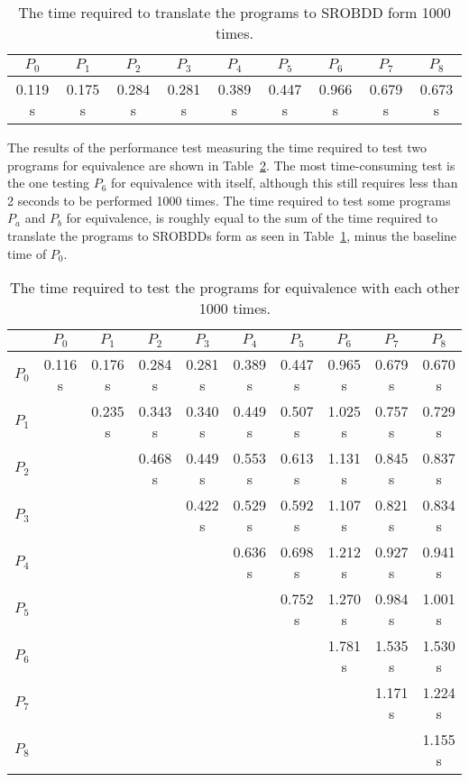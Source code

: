 \documentclass[a4paper,11pt]{kth-mag}
\begin{document}
\begin{table}
\centering
\begin{tabular}{*{9}{c}}
$P_0$   & $P_1$   & $P_2$   & $P_3$   & $P_4$   & $P_5$   & $P_6$   & $P_7$   & $P_8$   \\
\hline
0.119 s & 0.175 s & 0.284 s & 0.281 s & 0.389 s & 0.447 s & 0.966 s & 0.679 s & 0.673 s \\
\end{tabular}
\caption{The time required to translate the programs to SROBDD form 1000 times.}
\label{tab:performance1}
\end{table}

The results of the performance test measuring the time required to test two programs for equivalence are shown in Table~\ref{tab:performance2}.
The most time-consuming test is the one testing $P_6$ for equivalence with itself, although this still requires less than 2 seconds to be performed 1000 times.
The time required to test some programs $P_a$ and $P_b$ for equivalence, is roughly equal to the sum of the time required to translate the programs to SROBDDs form as seen in Table~\ref{tab:performance1}, minus the baseline time of $P_0$.

\begin{table}
\centering
\begin{tabular}{l|*{9}{c}}
      & $P_0$   & $P_1$   & $P_2$   & $P_3$   & $P_4$   & $P_5$   & $P_6$   & $P_7$   & $P_8$   \\
\hline
$P_0$ & 0.116 s & 0.176 s & 0.284 s & 0.281 s & 0.389 s & 0.447 s & 0.965 s & 0.679 s & 0.670 s \\
$P_1$ &         & 0.235 s & 0.343 s & 0.340 s & 0.449 s & 0.507 s & 1.025 s & 0.757 s & 0.729 s \\
$P_2$ &         &         & 0.468 s & 0.449 s & 0.553 s & 0.613 s & 1.131 s & 0.845 s & 0.837 s \\
$P_3$ &         &         &         & 0.422 s & 0.529 s & 0.592 s & 1.107 s & 0.821 s & 0.834 s \\
$P_4$ &         &         &         &         & 0.636 s & 0.698 s & 1.212 s & 0.927 s & 0.941 s \\
$P_5$ &         &         &         &         &         & 0.752 s & 1.270 s & 0.984 s & 1.001 s \\
$P_6$ &         &         &         &         &         &         & 1.781 s & 1.535 s & 1.530 s \\
$P_7$ &         &         &         &         &         &         &         & 1.171 s & 1.224 s \\
$P_8$ &         &         &         &         &         &         &         &         & 1.155 s \\
\end{tabular}
\caption{The time required to test the programs for equivalence with each other 1000 times.}
\label{tab:performance2}
\end{table}
\end{document}
